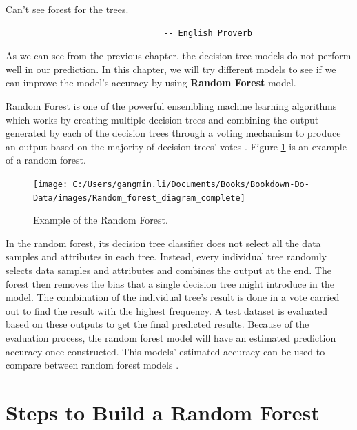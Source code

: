 \documentclass[
]{book}
\renewenvironment{quote}{\begin{VF}}{\end{VF}}
\begin{document}
\begin{quote}
Can't see forest for the trees.

\begin{verbatim}
                                -- English Proverb
\end{verbatim}
\end{quote}

As we can see from the previous chapter, the decision tree models do not perform well in our prediction. In this chapter, we will try different models to see if we can improve the model's accuracy by using \textbf{Random Forest} model.

Random Forest is one of the powerful ensembling machine learning algorithms which works by creating multiple decision trees and combining the output generated by each of the decision trees through a voting mechanism to produce an output based on the majority of decision trees' votes \citep{Trevor2013}. Figure \ref{fig:forest} is an example of a random forest.

\begin{figure}

{\centering \texttt{[image: C:/Users/gangmin.li/Documents/Books/Bookdown-Do-Data/images/Random\_forest\_diagram\_complete]} 

}

\caption{Example of the Random Forest.}\label{fig:forest}
\end{figure}

In the random forest, its decision tree classifier does not select all the data samples and attributes in each tree. Instead, every individual tree randomly selects data samples and attributes and combines the output at the end. The forest then removes the bias that a single decision tree might introduce in the model. The combination of the individual tree's result is done in a vote carried out to find the result with the highest frequency. A test dataset is evaluated based on these outputs to get the final predicted results. Because of the evaluation process, the random forest model will have an estimated prediction accuracy once constructed. This models' estimated accuracy can be used to compare between random forest models \citep{Aleksandra2021}.

\hypertarget{steps-to-build-a-random-forest}{%
\section{Steps to Build a Random Forest}\label{steps-to-build-a-random-forest}}
\end{document}
